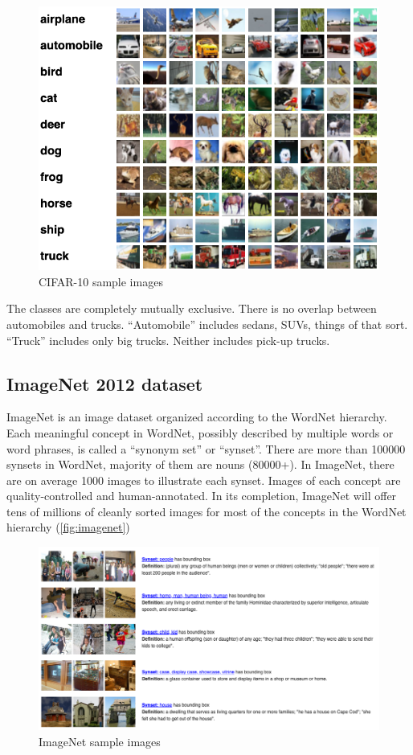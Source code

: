 \begin{figure}[ht]
    \includegraphics[width=\textwidth]{images/experiments/CIFAR_10.png}
    \centering
    \caption{CIFAR-10 sample images}\label{fig:CIFAR_10}
\end{figure}

The classes are completely mutually exclusive. There is no overlap between
automobiles and trucks. ``Automobile'' includes sedans, SUVs, things of that
sort. ``Truck'' includes only big trucks. Neither includes pick-up trucks.

\subsection{ImageNet 2012 dataset}
ImageNet is an image dataset organized according to the WordNet hierarchy. Each
meaningful concept in WordNet, possibly described by multiple words or word
phrases, is called a ``synonym set'' or ``synset''. There are more than 100000
synsets in WordNet, majority of them are nouns (80000+). In ImageNet, there are
on average 1000 images to illustrate each synset.
Images of each concept are quality-controlled and human-annotated. In its
completion, ImageNet will offer tens of millions of cleanly sorted images for
most of the concepts in the WordNet hierarchy (\autoref{fig:imagenet})

\begin{figure}[ht]
    \includegraphics[width=\textwidth]{images/experiments/imagenet.png}
    \centering
    \caption{ImageNet sample images}\label{fig:imagenet}
\end{figure}

